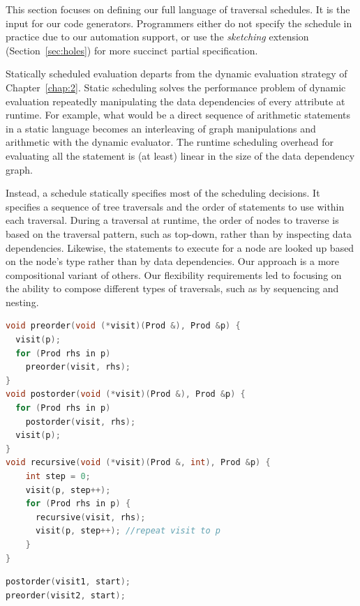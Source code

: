 This section focuses on defining our full language of traversal schedules. It is the input for our code generators. Programmers either do not specify the schedule in practice due to our automation support, or use the \emph{sketching} extension (Section~\ref{sec:holes}) for more succinct partial specification.

Statically scheduled evaluation departs from the dynamic evaluation strategy of Chapter~\ref{chap:2}. Static scheduling solves the performance problem of dynamic evaluation repeatedly manipulating the data dependencies of every attribute at runtime. For example, what would be a direct sequence of arithmetic statements in a static language becomes an interleaving of graph manipulations and arithmetic with the dynamic evaluator. The runtime scheduling overhead for evaluating all the statement is (at least) linear in the size of the data dependency graph. 

Instead, a schedule statically specifies most of the scheduling decisions.  It specifies a sequence of tree traversals and the order of statements to use within each traversal. During a traversal at runtime, the order of nodes to traverse is based on the traversal pattern, such as top-down, rather than by inspecting data dependencies. Likewise, the statements to execute for a node are looked up based on the node's type rather than by data dependencies.  Our approach is a more compositional variant of others. Our flexibility requirements led to focusing on the ability to compose different types of traversals, such as by sequencing and nesting.


\newsavebox{\seqtraversals}
\begin{lrbox}{\seqtraversals}%
\begin{minipage}{1\columnwidth}
\begin{lstlisting}[mathescape,language=C++,morekeywords={spawn,join}]
void preorder(void (*visit)(Prod &), Prod &p) {
  visit(p);
  for (Prod rhs in p) 
    preorder(visit, rhs);
}
void postorder(void (*visit)(Prod &), Prod &p) {
  for (Prod rhs in p) 
    postorder(visit, rhs);
  visit(p);
}
void recursive(void (*visit)(Prod &, int), Prod &p) {
    int step = 0;
    visit(p, step++);
    for (Prod rhs in p) {
      recursive(visit, rhs);
      visit(p, step++); //repeat visit to p
    }
}
\end{lstlisting}
\end{minipage}
\end{lrbox}

\newsavebox{\seqtraversalsequence}
\begin{lrbox}{\seqtraversalsequence}%
\begin{minipage}{1\columnwidth}
\begin{lstlisting}[mathescape,language=C++,morekeywords={spawn,join}]
postorder(visit1, start); 
preorder(visit2, start);
\end{lstlisting}
\end{minipage}
\end{lrbox}


